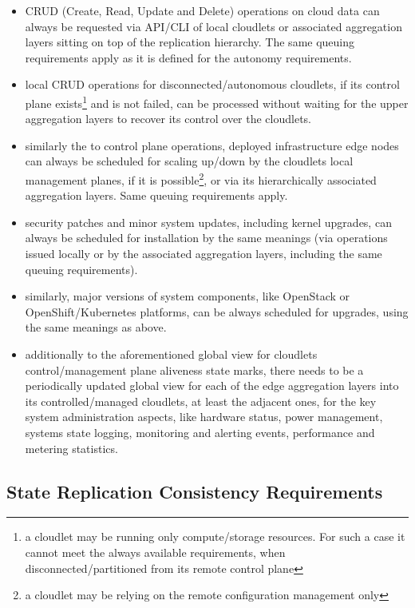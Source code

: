 \documentclass[conference]{IEEEtran}
\begin{document}
\begin{itemize}
  \item CRUD (Create, Read, Update and Delete) operations on cloud data can
    always be requested via API/CLI of local cloudlets or associated aggregation
    layers sitting on top of the replication hierarchy. The same queuing
    requirements apply as it is defined for the autonomy requirements.
  \item local CRUD operations for disconnected/autonomous cloudlets, if its
    control plane exists\footnote{a cloudlet may be running only
    compute/storage resources. For such a case it cannot meet the always
    available requirements, when disconnected/partitioned from its remote
    control plane} and is not failed, can be processed without waiting for the
    upper aggregation layers to recover its control over the cloudlets.
  \item similarly the to control plane operations, deployed infrastructure edge
    nodes can always be scheduled for scaling up/down by the cloudlets local
    management planes, if it is possible\footnote{a cloudlet may be relying on
    the remote configuration management only}, or via its hierarchically
    associated aggregation layers. Same queuing requirements apply.
  \item security patches and minor system updates, including kernel upgrades,
    can always be scheduled for installation by the same meanings (via
    operations issued locally or by the associated aggregation layers,
    including the same queuing requirements).
  \item similarly, major versions of system components, like OpenStack or
    OpenShift/Kubernetes platforms, can be always scheduled for upgrades, using
    the same meanings as above.
  \item additionally to the aforementioned global view for cloudlets
    control/management plane aliveness state marks, there needs to be a
    periodically updated global view for each of the edge aggregation layers
    into its controlled/managed cloudlets, at least the adjacent ones, for
    the key system administration aspects, like hardware status,
    power management, systems state logging, monitoring and alerting events,
    performance and metering statistics.
\end{itemize}

\subsection{State Replication Consistency Requirements}
\end{document}
